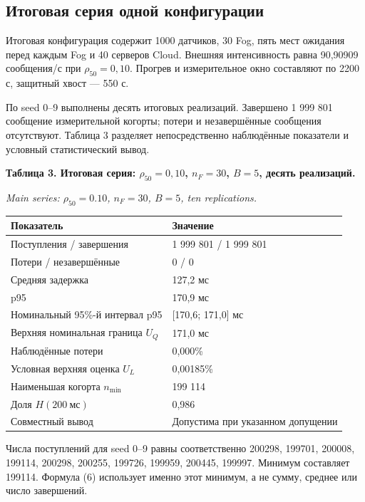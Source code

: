 \hypertarget{ux438ux442ux43eux433ux43eux432ux430ux44f-ux441ux435ux440ux438ux44f-ux43eux434ux43dux43eux439-ux43aux43eux43dux444ux438ux433ux443ux440ux430ux446ux438ux438}{%
\subsection{Итоговая серия одной конфигурации}}

Итоговая конфигурация содержит 1000 датчиков, 30 Fog, пять мест ожидания перед каждым Fog и 40 серверов Cloud. Внешняя интенсивность равна 90,90909 сообщения/с при \(\rho_{50}=0{,}10\). Прогрев и измерительное окно составляют по 2200 с, защитный хвост --- 550 с.

По seed 0--9 выполнены десять итоговых реализаций. Завершено 1 999 801 сообщение измерительной когорты; потери и незавершённые сообщения отсутствуют. Таблица 3 разделяет непосредственно наблюдённые показатели и условный статистический вывод.

\textbf{Таблица 3. Итоговая серия: \(\rho_{50}=0{,}10\), \(n_F=30\), \(B=5\), десять реализаций.}

\emph{Main series: \(\rho_{50}=0.10\), \(n_F=30\), \(B=5\), ten replications.}

{\small\setlength{\tabcolsep}{3pt}
\begin{longtable}[]{@{}ll@{}}
\toprule\noalign{}
Показатель & Значение \\
\midrule\noalign{}
\endhead
\bottomrule\noalign{}
\endlastfoot
Поступления / завершения & 1 999 801 / 1 999 801 \\
Потери / незавершённые & 0 / 0 \\
Средняя задержка & 127,2 мс \\
p95 & 170,9 мс \\
Номинальный 95\%-й интервал p95 & {[}170,6; 171,0{]} мс \\
Верхняя номинальная граница \(U_Q\) & 171,0 мс \\
Наблюдённые потери & 0,000\% \\
Условная верхняя оценка \(U_L\) & 0,00185\% \\
Наименьшая когорта \(n_{\min}\) & 199 114 \\
Доля \(H(200\ \text{мс})\) & 0,986 \\
Совместный вывод & Допустима при указанном допущении \\
\end{longtable}
}

Числа поступлений для seed 0--9 равны соответственно 200298, 199701, 200008, 199114, 200298, 200255, 199726, 199959, 200445, 199997. Минимум составляет 199114. Формула (6) использует именно этот минимум, а не сумму, среднее или число завершений.


